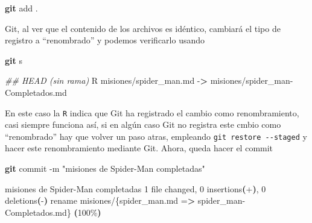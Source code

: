 \documentclass[
]{book}
\newenvironment{Shaded}{\begin{snugshade}}{\end{snugshade}}
\newcommand{\AttributeTok}[1]{\textcolor[rgb]{0.13,0.29,0.53}{#1}}
\newcommand{\CommentTok}[1]{\textcolor[rgb]{0.56,0.35,0.01}{\textit{#1}}}
\newcommand{\ErrorTok}[1]{\textcolor[rgb]{0.64,0.00,0.00}{\textbf{#1}}}
\newcommand{\ExtensionTok}[1]{#1}
\newcommand{\FunctionTok}[1]{\textcolor[rgb]{0.13,0.29,0.53}{\textbf{#1}}}
\newcommand{\KeywordTok}[1]{\textcolor[rgb]{0.13,0.29,0.53}{\textbf{#1}}}
\newcommand{\NormalTok}[1]{#1}
\newcommand{\OperatorTok}[1]{\textcolor[rgb]{0.81,0.36,0.00}{\textbf{#1}}}
\newcommand{\StringTok}[1]{\textcolor[rgb]{0.31,0.60,0.02}{#1}}
\begin{document}
\begin{Shaded}
\begin{Highlighting}[]
\FunctionTok{git}\NormalTok{ add .}
\end{Highlighting}
\end{Shaded}

Git, al ver que el contenido de los archivos es idéntico, cambiará el tipo de registro a ``renombrado'' y podemos verificarlo usando

\begin{Shaded}
\begin{Highlighting}[]
\FunctionTok{git}\NormalTok{ s}
\end{Highlighting}
\end{Shaded}

\begin{Shaded}
\begin{Highlighting}[]
\CommentTok{\#\# HEAD (sin rama)}
\ExtensionTok{R}\NormalTok{  misiones/spider\_man.md }\AttributeTok{{-}}\OperatorTok{\textgreater{}}\NormalTok{ misiones/spider\_man{-}Completados.md}
\end{Highlighting}
\end{Shaded}

En este caso la \texttt{R} indica que Git ha registrado el cambio como renombramiento, casi siempre funciona así, si en algún caso Git no registra este cmbio como ``renombrado'' hay que volver un paso atras, empleando \texttt{git\ restore\ -\/-staged} y hacer este renombramiento mediante Git.
Ahora, queda hacer el commit

\begin{Shaded}
\begin{Highlighting}[]
\FunctionTok{git}\NormalTok{ commit }\AttributeTok{{-}m} \StringTok{"misiones de Spider{-}Man completadas"}
\end{Highlighting}
\end{Shaded}

\begin{Shaded}
\begin{Highlighting}[]
\ExtensionTok{[main}\NormalTok{ e31eae6] misiones de Spider{-}Man completadas}
 \ExtensionTok{1}\NormalTok{ file changed, 0 insertions}\ErrorTok{(}\ExtensionTok{+}\KeywordTok{)}\ExtensionTok{,}\NormalTok{ 0 deletions}\ErrorTok{(}\ExtensionTok{{-}}\KeywordTok{)}
 \ExtensionTok{rename}\NormalTok{ misiones/\{spider\_man.md =}\OperatorTok{\textgreater{}}\NormalTok{ spider\_man{-}Completados.md\} }\ErrorTok{(}\ExtensionTok{100\%}\KeywordTok{)}
\end{Highlighting}
\end{Shaded}
\end{document}
